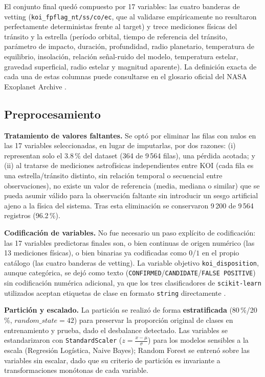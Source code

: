 \documentclass[10pt,journal]{IEEEtran}
\begin{document}
  El conjunto final qued\'o compuesto por 17 variables: las cuatro banderas de vetting (\texttt{koi\_fpflag\_nt/ss/co/ec}, que al validarse emp\'iricamente no resultaron perfectamente deterministas frente al target) y trece mediciones f\'isicas del tr\'ansito y la estrella (per\'iodo orbital, tiempo de referencia del tr\'ansito, par\'ametro de impacto, duraci\'on, profundidad, radio planetario, temperatura de equilibrio, insolaci\'on, relaci\'on se\~nal-ruido del modelo, temperatura estelar, gravedad superficial, radio estelar y magnitud aparente). La definici\'on exacta de cada una de estas columnas puede consultarse en el glosario oficial del NASA Exoplanet Archive \cite{nasa_koi_columns_2026}.

  \subsection{Preprocesamiento}

  \textbf{Tratamiento de valores faltantes.} Se opt\'o por eliminar las filas con nulos en las 17 variables seleccionadas, en lugar de imputarlas, por dos razones: (i) representan solo el 3.8\,\% del dataset (364 de 9\,564 filas), una p\'erdida acotada; y (ii) al tratarse de mediciones astrof\'isicas independientes entre KOI (cada fila es una estrella/tr\'ansito distinto, sin relaci\'on temporal o secuencial entre observaciones), no existe un valor de referencia (media, mediana o similar) que se pueda asumir v\'alido para la observaci\'on faltante sin introducir un sesgo artificial ajeno a la f\'isica del sistema. Tras esta eliminaci\'on se conservaron 9\,200 de 9\,564 registros (96.2\,\%).

  \textbf{Codificaci\'on de variables.} No fue necesario un paso expl\'icito de codificaci\'on: las 17 variables predictoras finales son, o bien continuas de origen num\'erico (las 13 mediciones f\'isicas), o bien binarias ya codificadas como $0$/$1$ en el propio cat\'alogo (las cuatro banderas de vetting). La variable objetivo \texttt{koi\_disposition}, aunque categ\'orica, se dej\'o como texto (\texttt{CONFIRMED}/\texttt{CANDIDATE}/\texttt{FALSE POSITIVE}) sin codificaci\'on num\'erica adicional, ya que los tres clasificadores de \texttt{scikit-learn} utilizados aceptan etiquetas de clase en formato \texttt{string} directamente \cite{pedregosa2011}.

  \textbf{Partici\'on y escalado.} La partici\'on se realiz\'o de forma \textbf{estratificada} (80\,\%/20\,\%, $random\_state=42$) para preservar la proporci\'on original de clases en entrenamiento y prueba, dado el desbalance detectado. Las variables se estandarizaron con \texttt{StandardScaler} ($z = \frac{x-\mu}{\sigma}$) para los modelos sensibles a la escala (Regresi\'on Log\'istica, Naive Bayes); Random Forest se entren\'o sobre las variables sin escalar, dado que su criterio de partici\'on es invariante a transformaciones mon\'otonas de cada variable.
\end{document}
